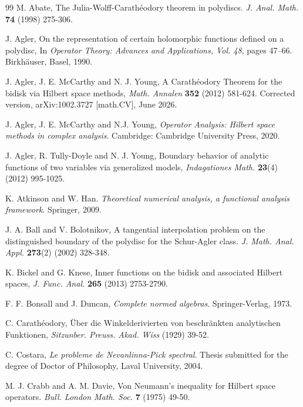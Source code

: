 \documentclass[11pt, reqno]{amsart}
\newcommand\1{\boldsymbol {1}}
\numberwithin{equation}{section}
\begin{document}
\begin{thebibliography}{99}
 M. Abate, The Julia-Wolff-Carath\'{e}odory theorem in polydiscs. {\it{J. Anal. Math.}} {\bf 74} (1998) 275-306.

 J. Agler, On the representation of certain holomorphic functions defined on a polydisc, In {\em Operator Theory: Advances and Applications, {\rm Vol. 48}}, pages
  47--66. {Birkh\"auser}, Basel, 1990.
  
  J. Agler, J. E. McCarthy and N. J. Young,  A Carath\'eodory Theorem for the bidisk via Hilbert space methods,  {\em Math. Annalen} {\bf 352} (2012) 581-624. Corrected version, arXiv:1002.3727 [math.CV], June 2026. 

 J. Agler, J. E. McCarthy and N.J. Young, {\it Operator Analysis: Hilbert space methods in complex analysis}. Cambridge: Cambridge University Press, 2020.

 J. Agler, R. Tully-Doyle and N. J. Young,  Boundary behavior of analytic functions of two variables via generalized models, {\em Indagationes Math.} {\bf 23}(4) (2012) 995-1025.

 K. Atkinson and W. Han. {\it Theoretical numerical analysis, a functional analysis framework}. Springer, 2009.

 J. A. Ball and V. Bolotnikov, A tangential interpolation problem on the distinguished boundary of the polydisc for the Schur-Agler class. {\it J. Math. Anal. Appl.} {\bf 273}(2)
(2002) 328-348.

 K. Bickel and G. Knese, Inner functions on the bidisk and associated Hilbert spaces, 
 {\it J. Func. Anal.} {\bf 265} (2013) 2753-2790.
 
 F. F. Bonsall and J. Duncan, {\it Complete normed algebras}. Springer-Verlag, 1973.

 C. Carath\'{e}odory, \"{U}ber die Winkelderivierten von beschr\"{a}nkten analytischen Funktionen, {\it Sitzunber. Preuss. Akad. Wiss} (1929) 39-52.

 C. Costara, {\it{Le probleme de Nevanlinna-Pick spectral}}. Thesis submitted for the degree of Doctor of Philosophy, Laval University, 2004.

 M. J. Crabb and A. M. Davie, Von Neumann's inequality for Hilbert space operators. {\it{Bull. London Math. Soc.}}  {\bf 7} (1975) 49-50.


\end{thebibliography}
\end{document}
